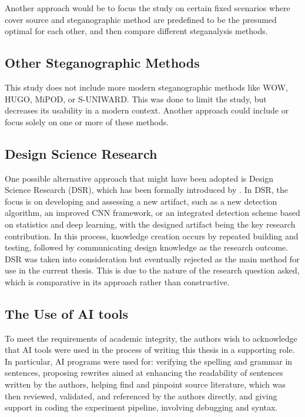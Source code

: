 Another approach would be to focus the study on certain fixed scenarios where cover source and steganographic method are predefined to be the presumed optimal for each other, and then compare different steganalysis methods.

\subsection{Other Steganographic Methods}
This study does not include more modern steganographic methods like WOW, HUGO, MiPOD, or S-UNIWARD. This was done to limit the study, but decreases its usability in a modern context.
Another approach could include or focus solely on one or more of these methods. 

\subsection{Design Science Research}
One possible alternative approach that might have been adopted is Design Science Research (DSR), which has been formally introduced by \textcite{ChatterjeeHevner2010}. 
In DSR, the focus is on developing and assessing a new artifact, such as a new detection algorithm, an improved CNN framework, 
or an integrated detection scheme based on statistics and deep learning, with the designed artifact being the key research contribution. 
In this process, knowledge creation occurs by repeated building and testing, followed by communicating design knowledge as the research outcome.
DSR was taken into consideration but eventually rejected as the main method for use in the current thesis. 
This is due to the nature of the research question asked, which is comparative in its approach rather than constructive.

\subsection{The Use of AI tools}
To meet the requirements of academic integrity, the authors wish to acknowledge that AI tools were used in the process of writing this thesis in a 
supporting role. 
In particular, AI programs were used for: verifying the spelling and grammar in sentences, proposing rewrites aimed at 
enhancing the readability of sentences written by the authors, helping find and pinpoint source literature, which was then reviewed, 
validated, and referenced by the authors directly, and giving support in coding the experiment pipeline, involving debugging and syntax.
